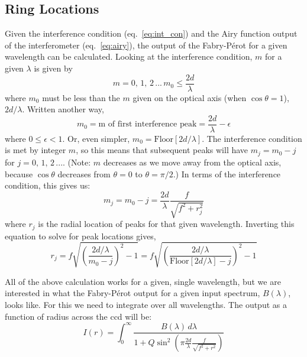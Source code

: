 \documentclass{article}
\begin{document}
\subsection*{Ring Locations}
Given the interference condition (eq.~\ref{eq:int_con}) and the Airy function output of the interferometer (eq.~\ref{eq:airy}), the output of the Fabry-P\'{e}rot for a given wavelength can be calculated. Looking at the interference condition, $m$ for a given $\lambda$ is given by 
\begin{equation}
m = 0,\,1,\,2\,...\,m_{0}\leq\frac{2d}{\lambda}
\end{equation}
where $m_{0}$ must be less than the $m$ given on the optical axis (when $\cos{\theta}=1$), $2d/\lambda$. Written another way,
\begin{equation}
m_{0} = \text{m of first interference peak} = \frac{2d}{\lambda} - \epsilon
\end{equation}
where $0\leq\epsilon<1$. Or, even simpler, $m_{0}=\text{Floor}[2d/\lambda]$. The interference condition is met by integer $m$, so this means that subsequent peaks will have $m_{j}=m_{0}-j$ for $j=0,\,1,\,2\,...$. (Note: $m$ decreases as we move away from the optical axis, because $\cos{\theta}$ decreases from $\theta=0$ to $\theta=\pi/2$.) In terms of the interference condition, this gives us:
\begin{equation}
m_{j}=m_{0}-j =\frac{2d}{\lambda}\frac{f}{\sqrt{f^{2}+r_{j}^{2}}}
\label{eq:mj}
\end{equation}
where $r_{j}$ is the radial location of peaks for that given wavelength. Inverting this equation to solve for peak locations gives,
\begin{equation}
r_{j} = f\sqrt{\left(\frac{2d/\lambda}{m_{0}-j}\right)^{2}-1}=f\sqrt{\left(\frac{2d/\lambda}{\text{Floor}[2d/\lambda]-j}\right)^{2}-1}
\end{equation}


All of the above calculation works for a given, single wavelength, but we are interested in what the Fabry-P\'{e}rot output for a given input spectrum, $B(\lambda)$, looks like. For this we need to integrate over all wavelengths. The output as a function of radius across the ccd will be:
\begin{equation}
I(r) = \int_{0}^{\infty} \frac{B(\lambda)\,d\lambda}{1+Q\sin^{2}{\left(\pi \frac{2d}{\lambda}\frac{f}{\sqrt{f^{2}+r^{2}}}\right)}}
\label{eq:pattern}
\end{equation}
\end{document}
